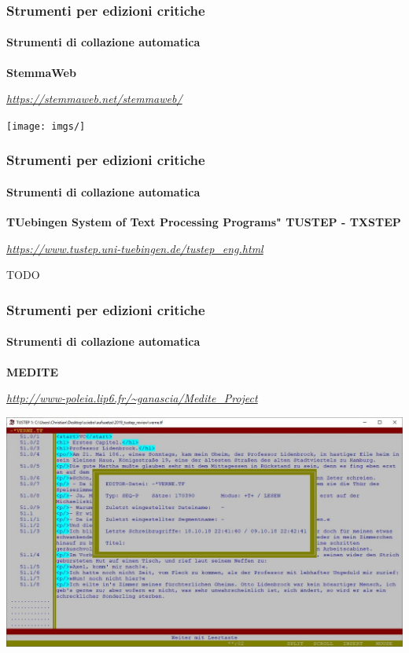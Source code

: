\begin{frame}
    \frametitle{Strumenti per edizioni critiche}
    \framesubtitle{Strumenti di collazione automatica}
	\addtocounter{nframe}{1}
    \begin{center}
        \textbf{StemmaWeb}
    \end{center}
    \begin{center}
        \textit{\url{https://stemmaweb.net/stemmaweb/}}
	\end{center}
    \begin{center}
        \texttt{[image: imgs/]}
	\end{center}
\end{frame}

\begin{frame}
    \frametitle{Strumenti per edizioni critiche}
    \framesubtitle{Strumenti di collazione automatica}
	\addtocounter{nframe}{1}
    \begin{center}
        \textbf{TUebingen System of Text Processing Programs" TUSTEP - TXSTEP}
    \end{center}
    \begin{center}
        \textit{\url{https://www.tustep.uni-tuebingen.de/tustep_eng.html}}
	\end{center}
    \begin{center}
        TODO
	\end{center}
\end{frame}

\begin{frame}
    \frametitle{Strumenti per edizioni critiche}
    \framesubtitle{Strumenti di collazione automatica}
	\addtocounter{nframe}{1}
    \begin{center}
        \textbf{MEDITE}
    \end{center}
    \begin{center}
        \textit{\url{http://www-poleia.lip6.fr/~ganascia/Medite_Project}}
	\end{center}
    \begin{center}
        \includegraphics[width=.95\textwidth]{imgs/tustep.jpg}
	\end{center}
\end{frame}




